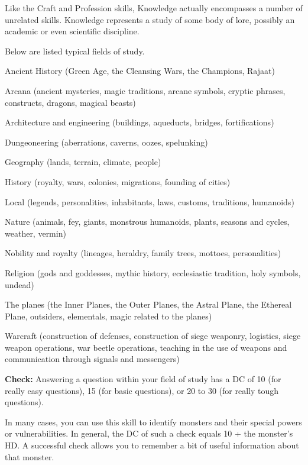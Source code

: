 Like the Craft and Profession skills, Knowledge actually encompasses a number of unrelated skills. Knowledge represents a study of some body of lore, possibly an academic or even scientific discipline.

Below are listed typical fields of study.

\begin{itemize*}
\item Ancient History (Green Age, the Cleansing Wars, the Champions, Rajaat)
\item Arcana (ancient mysteries, magic traditions, arcane symbols, cryptic phrases, constructs, dragons, magical beasts)
\item Architecture and engineering (buildings, aqueducts, bridges, fortifications)
\item Dungeoneering (aberrations, caverns, oozes, spelunking)
\item Geography (lands, terrain, climate, people)
\item History (royalty, wars, colonies, migrations, founding of cities)
\item Local (legends, personalities, inhabitants, laws, customs, traditions, humanoids)
\item Nature (animals, fey, giants, monstrous humanoids, plants, seasons and cycles, weather, vermin)
\item Nobility and royalty (lineages, heraldry, family trees, mottoes, personalities)
\item Religion (gods and goddesses, mythic history, ecclesiastic tradition, holy symbols, undead)
\item The planes (the Inner Planes, the Outer Planes, the Astral Plane, the Ethereal Plane, outsiders, elementals, magic related to the planes)
\item Warcraft (construction of defenses, construction of siege weaponry, logistics, siege weapon operations, war beetle operations, teaching in the use of weapons and communication through signals and messengers)
\end{itemize*}

\textbf{Check:} Answering a question within your field of study has a DC of 10 (for really easy questions), 15 (for basic questions), or 20 to 30 (for really tough questions).

In many cases, you can use this skill to identify monsters and their special powers or vulnerabilities. In general, the DC of such a check equals 10 + the monster's HD. A successful check allows you to remember a bit of useful information about that monster.


